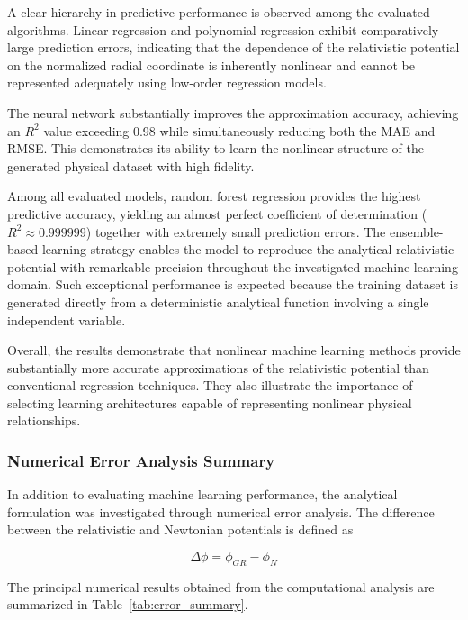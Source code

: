 \documentclass[
]{article}
\begin{document}
A clear hierarchy in predictive performance is observed among the evaluated algorithms. Linear regression and polynomial regression exhibit comparatively large prediction errors, indicating that the dependence of the relativistic potential on the normalized radial coordinate is inherently nonlinear and cannot be represented adequately using low-order regression models.

The neural network substantially improves the approximation accuracy, achieving an $R^2$ value exceeding 0.98 while simultaneously reducing both the MAE and RMSE. This demonstrates its ability to learn the nonlinear structure of the generated physical dataset with high fidelity.

Among all evaluated models, random forest regression provides the highest predictive accuracy, yielding an almost perfect coefficient of determination ($R^2 \approx 0.999999$) together with extremely small prediction errors. The ensemble-based learning strategy enables the model to reproduce the analytical relativistic potential with remarkable precision throughout the investigated machine-learning domain. Such exceptional performance is expected because the training dataset is generated directly from a deterministic analytical function involving a single independent variable.

Overall, the results demonstrate that nonlinear machine learning methods provide substantially more accurate approximations of the relativistic potential than conventional regression techniques. They also illustrate the importance of selecting learning architectures capable of representing nonlinear physical relationships.

\subsubsection{Numerical Error Analysis Summary}\label{numerical-error-analysis-summary}

In addition to evaluating machine learning performance, the analytical formulation was investigated through numerical error analysis. The difference between the relativistic and Newtonian potentials is defined as

\[
\Delta\phi=\phi_{GR}-\phi_N
\]

The principal numerical results obtained from the computational analysis are summarized in Table~\ref{tab:error_summary}.
\end{document}

